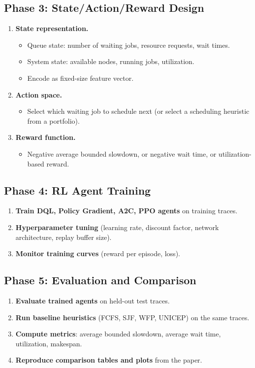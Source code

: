 \documentclass[11pt,a4paper]{article}
\begin{document}
\subsection{Phase 3: State/Action/Reward Design}
\begin{enumerate}[label=\textbf{3.\arabic*}]
  \item \textbf{State representation.}
    \begin{itemize}
      \item Queue state: number of waiting jobs, resource requests, wait times.
      \item System state: available nodes, running jobs, utilization.
      \item Encode as fixed-size feature vector.
    \end{itemize}
  \item \textbf{Action space.}
    \begin{itemize}
      \item Select which waiting job to schedule next (or select a scheduling heuristic from a portfolio).
    \end{itemize}
  \item \textbf{Reward function.}
    \begin{itemize}
      \item Negative average bounded slowdown, or negative wait time, or utilization-based reward.
    \end{itemize}
\end{enumerate}

\subsection{Phase 4: RL Agent Training}
\begin{enumerate}[label=\textbf{4.\arabic*}]
  \item \textbf{Train DQL, Policy Gradient, A2C, PPO agents} on training traces.
  \item \textbf{Hyperparameter tuning} (learning rate, discount factor, network architecture, replay buffer size).
  \item \textbf{Monitor training curves} (reward per episode, loss).
\end{enumerate}

\subsection{Phase 5: Evaluation and Comparison}
\begin{enumerate}[label=\textbf{5.\arabic*}]
  \item \textbf{Evaluate trained agents} on held-out test traces.
  \item \textbf{Run baseline heuristics} (FCFS, SJF, WFP, UNICEP) on the same traces.
  \item \textbf{Compute metrics}: average bounded slowdown, average wait time, utilization, makespan.
  \item \textbf{Reproduce comparison tables and plots} from the paper.
\end{enumerate}
\end{document}
